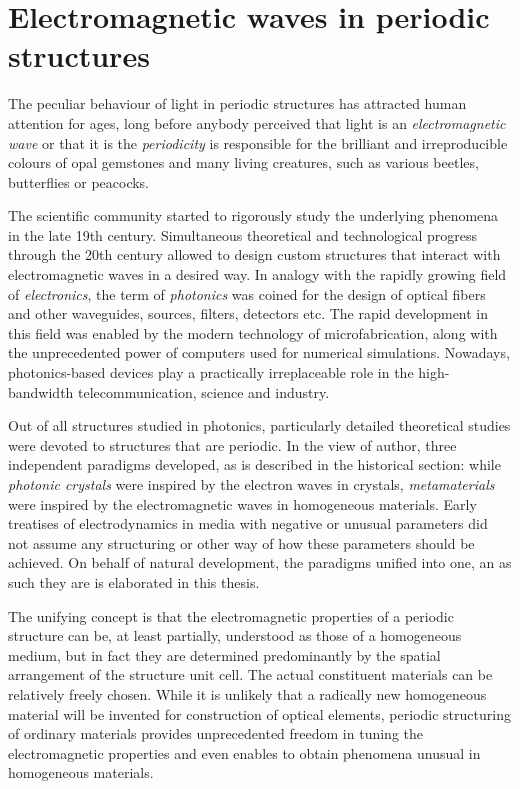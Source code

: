 
\section{Electromagnetic waves in periodic structures} %
The peculiar behaviour of light in periodic structures has attracted human attention for ages, long before anybody perceived that light is an \textit{electromagnetic wave} or that it is the \textit{periodicity} is responsible for the brilliant and irreproducible colours of opal gemstones and many living creatures, such as various beetles, butterflies or peacocks. 

The scientific community started to rigorously study the underlying phenomena in the late 19th century.
Simultaneous theoretical and technological progress through the 20th century allowed to design custom structures that interact with electromagnetic waves in a desired way. In analogy with the rapidly growing field of \textit{electronics}, the term of \textit{photonics} was coined for the design of optical fibers and other waveguides, sources, filters, detectors etc. The rapid development in this field was enabled by the modern technology of microfabrication, along with the unprecedented power of computers used for numerical simulations. Nowadays, photonics-based devices play a practically irreplaceable role in the high-bandwidth telecommunication, science and industry.

Out of all structures studied in photonics, particularly detailed theoretical studies were devoted to structures that are periodic. %
In the view of author, three independent paradigms developed, as is described in the historical section: while \textit{photonic crystals} were inspired by the electron waves in crystals, \textit{metamaterials} were inspired by the electromagnetic waves in homogeneous materials. Early treatises of electrodynamics in media with negative or unusual parameters did not assume any structuring or other way of how these parameters should be achieved. On behalf of natural development, the paradigms unified into one, an as such they are is elaborated in this thesis.

The unifying concept is that the electromagnetic properties of a periodic structure can be, at least partially, understood as those of a homogeneous medium, but in fact they are determined predominantly by the spatial arrangement of the structure unit cell. The actual constituent materials can be relatively freely chosen. %
While it is unlikely that a radically new homogeneous material will be invented for construction of optical elements, periodic structuring of ordinary materials provides unprecedented freedom in tuning the electromagnetic properties and even enables to obtain phenomena unusual in homogeneous materials. 

